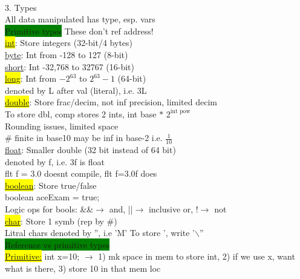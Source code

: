 ~\\ \color{RoyalPurple}
3. Types
\\ All data manipulated has type, esp. vars
\\ \colorbox{Green}{Primitive types} These don't ref address!
\\ \colorbox{Yellow}{\underline{int}}: Store integers (32-bit/4 bytes)
\\ \underline{byte}: Int from -128 to 127 (8-bit)
\\ \underline{short}: Int -32,768 to 32767 (16-bit)
\\ \colorbox{Yellow}{\underline{long}}: Int from $-2^{63}$ to $2^{63}-1$ (64-bit)
\\ denoted by L after val (literal), i.e. 3L
\\ \colorbox{Yellow}{\underline{double}}: Store frac/decim, not inf precision, limited decim
\\ To store dbl, comp stores 2 ints, int base $*$ $2^{\text{int pow}}$
\\ Rounding issues, limited space
\\ \# finite in base10 may be inf in base-2 i.e. $\frac{1}{10}$
\\ \underline{float}: Smaller double (32 bit instead of 64 bit)
\\ denoted by f, i.e. 3f is float
\\ flt f = 3.0 doesnt compile, flt f=3.0f does
\\ \colorbox{Yellow}{\underline{boolean}}: Store true/false
\\ boolean aceExam = true; 
\\ Logic ops for bools: \&\&$\rightarrow$ and, ||$\rightarrow$ inclusive or, !$\rightarrow$ not
\\ \colorbox{Yellow}{\underline{char}}: Store 1 symb (rep by \#)
\\ Litral chars denoted by '', i.e 'M' To store ', write '$\backslash$''
\\ \colorbox{Green}{Reference vs primitive types}
\\ \colorbox{Yellow}{\underline{Primitive:}} int x=10; $\rightarrow$ 1) mk space in mem to store int, 2) if we use x, want what is there, 3) store 10 in that mem loc
